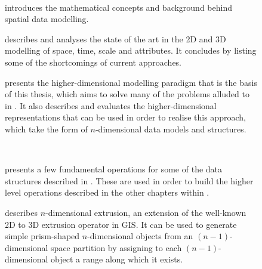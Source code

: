 
\begin{description}

\item[ ] \ 

\begin{description}

\item[]
introduces the mathematical concepts and background behind spatial data modelling.

\item[]
describes and analyses the state of the art in the 2D and 3D modelling of space, time, scale and attributes.
It concludes by listing some of the shortcomings of current approaches.

\item[]
presents the higher-dimensional modelling paradigm that is the basis of this thesis, which aims to solve many of the problems alluded to in .
It also describes and evaluates the higher-dimensional representations that can be used in order to realise this approach, which take the form of $n$-dimensional data models and structures.

\end{description}

\item[ ] \ 

\begin{description}

\item[]
presents a few fundamental operations for some of the data structures described in .
These are used in order to build the higher level operations described in the other chapters within .

\item[]
describes $n$-dimensional extrusion, an extension of the well-known 2D to 3D extrusion operator in GIS.\@
It can be used to generate simple prism-shaped $n$-dimensional objects from an $(n-1)$-dimensional space partition by assigning to each $(n-1)$-dimensional object a range along which it exists.


\end{description}
\end{description}
